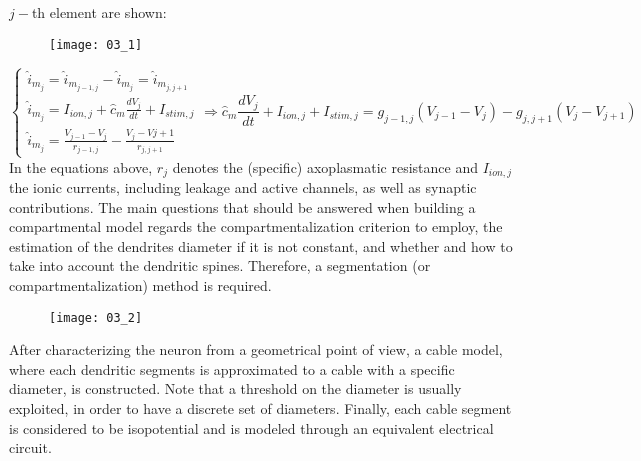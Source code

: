 \(j-\)th element are shown:
\begin{figure}[H]
    \texttt{[image: 03\_1]}
    \centering
\end{figure}
\begin{equation*}
    \begin{cases}
        \hat{i}_{m_{j}}=\hat{i}_{m_{j-1,j}}-\hat{i}_{m_{j}}=\hat{i}_{m_{j,j+1}} \\
        \hat{i}_{m_{j}}=I_{ion,j}+\hat{c}_{m}\frac{dV_{j}}{dt}+I_{stim,j}       \\
        \hat{i}_{m_{j}}=\frac{V_{j-1}-V_{j}}{r_{j-1,j}}-\frac{V_{j}-V{j+1}}{r_{j,j+1}}
    \end{cases}
    \Rightarrow
    \hat{c}_{m}\frac{dV_{j}}{dt}+I_{ion,j}+I_{stim,j}=g_{j-1,j}(V_{j-1}-V_{j})-g_{j,j+1}(V_{j}-V_{j+1})
\end{equation*}
In the equations above, \(r_{j}\) denotes the (specific) axoplasmatic resistance and \(I_{ion,j}\)
the ionic currents, including leakage and active channels, as well as synaptic contributions.
The main questions that should be answered when building a compartmental model regards the
compartmentalization criterion to employ, the estimation of the dendrites diameter if it is
not constant, and whether and how to take into account the dendritic spines. Therefore,
a segmentation (or compartmentalization) method is required.
\begin{figure}[H]
    \texttt{[image: 03\_2]}
    \centering
\end{figure}
After characterizing the neuron from a geometrical point of view, a cable model, where
each dendritic segments is approximated to a cable with a specific diameter, is constructed.
Note that a threshold on the diameter is usually exploited, in order to have a discrete
set of diameters. Finally, each cable segment is considered to be isopotential and is modeled
through an equivalent electrical circuit.

